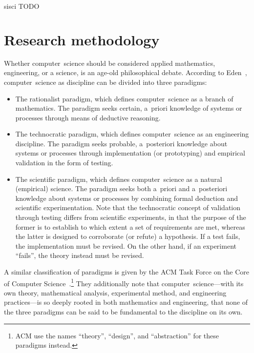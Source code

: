 \gls{sisci}
TODO

\section{Research methodology}\label{sec:methodology}
Whether computer~science should be considered applied mathematics, engineering, or a science, is an age-old philosophical debate.
%
According to Eden~\cite{Eden2007}, computer~science as discipline can be divided into three paradigms:
\begin{itemize}
    \item The rationalist paradigm, which defines computer~science as a branch of mathematics. 
        The paradigm seeks certain, a~priori knowledge of systems or processes through means of deductive reasoning.
    \item The technocratic paradigm, which defines computer~science as an engineering discipline.
        The paradigm seeks probable, a~posteriori knowledge about systems or processes through implementation (or prototyping) and empirical validation in the form of testing.
    \item The scientific paradigm, which defines computer~science as a natural (empirical) science.
        The paradigm seeks both a~priori and a~posteriori knowledge about systems or processes by combining formal deduction and scientific experimentation.
        Note that the technocratic concept of validation through testing differs from scientific experiments, in that the purpose of the former is to establish to which extent a set of requirements are met, whereas the latter is designed to corroborate (or refute) a hypothesis.
        If a test fails, the implementation must be revised. 
        On the other hand, if an experiment ``fails'', the theory instead must be revised.
\end{itemize}
%
A similar classification of paradigms is given by the ACM Task Force on the Core of Computer Science~\cite{Comer1989}.\footnote{ACM use the names ``theory'', ``design'', and ``abstraction'' for these paradigms instead.}
%
They additionally note that computer~science---with its own theory, mathematical analysis, experimental method, and engineering practices---is so deeply rooted in both mathematics and engineering, that none of the three paradigms can be said to be fundamental to the discipline on its own.



